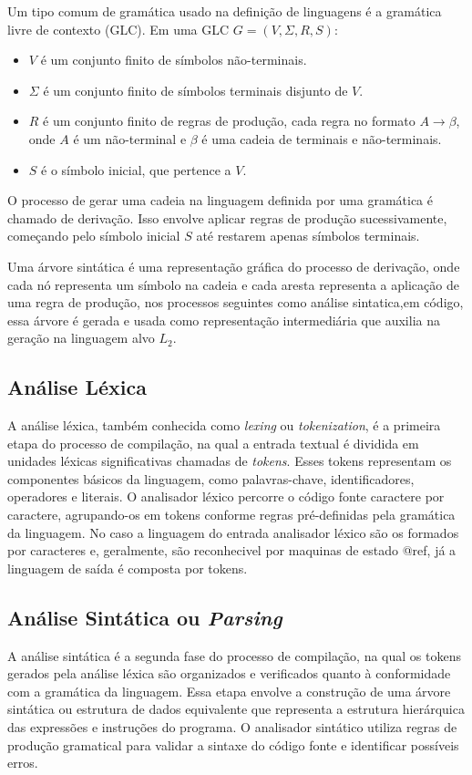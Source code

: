 \documentclass[english, 
               brazil, 
               bsc] %
               {dcomp-abntex2}
\begin{document}
Um tipo comum de gramática usado na definição de linguagens é a gramática livre de contexto (GLC). Em uma GLC $ G=(V,\Sigma,R,S)$:

\begin{itemize}
  \item $V$ é um conjunto finito de símbolos não-terminais.

  \item $\Sigma$ é um conjunto finito de símbolos terminais disjunto de $V$.

  \item $R$ é um conjunto finito de regras de produção, cada regra no formato $A \rightarrow \beta$, onde $A$ é um não-terminal e $\beta$ é uma cadeia de terminais e não-terminais.

  \item $S$ é o símbolo inicial, que pertence a $V$.
\end{itemize}

O processo de gerar uma cadeia na linguagem definida por uma gramática é chamado de derivação. Isso envolve aplicar regras de produção sucessivamente, começando pelo símbolo inicial $S$ até restarem apenas símbolos terminais.

Uma árvore sintática é uma representação gráfica do processo de derivação, onde cada nó representa um símbolo na cadeia e cada aresta representa a aplicação de uma regra de produção, nos processos seguintes como análise sintatica,em código, essa árvore é gerada e usada como representação intermediária que auxilia na geração na linguagem alvo $L_2$.


\subsection{Análise Léxica}
A análise léxica, também conhecida como \textit{lexing} ou \textit{tokenization}, é a primeira etapa do processo de compilação, na qual a entrada textual é dividida em unidades léxicas significativas chamadas de \textit{tokens}. Esses tokens representam os componentes básicos da linguagem, como palavras-chave, identificadores, operadores e literais. O analisador léxico percorre o código fonte caractere por caractere, agrupando-os em tokens conforme regras pré-definidas pela gramática da linguagem. No caso a linguagem do entrada analisador léxico são os formados por caracteres e, geralmente, são reconhecivel por maquinas de estado @ref, já a linguagem de saída é composta por tokens.

\subsection{Análise Sintática ou \textit{Parsing}}
A análise sintática é a segunda fase do processo de compilação, na qual os tokens gerados pela análise léxica são organizados e verificados quanto à conformidade com a gramática da linguagem. Essa etapa envolve a construção de uma árvore sintática ou estrutura de dados equivalente que representa a estrutura hierárquica das expressões e instruções do programa. O analisador sintático utiliza regras de produção gramatical para validar a sintaxe do código fonte e identificar possíveis erros.
\end{document}
